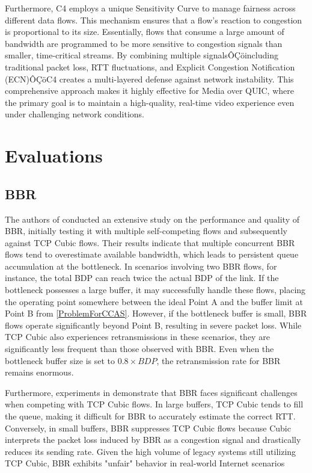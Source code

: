 \documentclass[conference]{IEEEtran}
\begin{document}
Furthermore, C4 employs a unique Sensitivity Curve to manage fairness across different data flows\cite{C4}. 
This mechanism ensures that a flow's reaction to congestion is proportional to its size.
Essentially, flows that consume a large amount of bandwidth are programmed to be more sensitive to congestion signals than smaller, time-critical streams. 
By combining multiple signalsÔÇöincluding traditional packet loss, RTT fluctuations, and Explicit Congestion Notification (ECN)ÔÇöC4 creates a multi-layered defense against network instability. 
This comprehensive approach makes it highly effective for Media over QUIC, where the primary goal is to maintain a high-quality, real-time video experience even under challenging network conditions.

 
\section{Evaluations}\label{sec:Evaluation}

\subsection{BBR}

The authors of \cite{BBREVALUATION} conducted an extensive study on the performance and quality of BBR, initially testing it with multiple self-competing flows and subsequently against TCP Cubic flows. 
Their results indicate that multiple concurrent BBR flows tend to overestimate available bandwidth, which leads to persistent queue accumulation at the bottleneck. 
In scenarios involving two BBR flows, for instance, the total BDP can reach twice the actual BDP of the link.  
If the bottleneck possesses a large buffer, it may successfully handle these flows, placing the operating point somewhere between the ideal Point A and the buffer limit at Point B from \ref{ProblemForCCAS}. 
However, if the bottleneck buffer is small, BBR flows operate significantly beyond Point B, resulting in severe packet loss. 
While TCP Cubic also experiences retransmissions in these scenarios, they are significantly less frequent than those observed with BBR. 
Even when the bottleneck buffer size is set to $0.8 \times BDP$, the retransmission rate for BBR remains enormous\cite{BBREVALUATION}.

Furthermore, experiments in \cite{BBREVALUATION} demonstrate that BBR faces significant challenges when competing with TCP Cubic flows. 
In large buffers, TCP Cubic tends to fill the queue, making it difficult for BBR to accurately estimate the correct RTT. 
Conversely, in small buffers, BBR suppresses TCP Cubic flows because Cubic interprets the packet loss induced by BBR as a congestion signal and drastically reduces its sending rate. 
Given the high volume of legacy systems still utilizing TCP Cubic, BBR exhibits "unfair" behavior in real-world Internet scenarios
\end{document}
